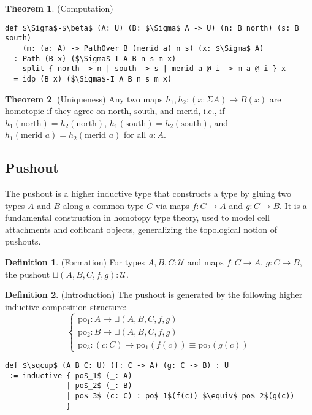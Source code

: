 \documentclass{article}
\theoremstyle{definition}
\newtheorem{theorem}{Theorem}
\newtheorem{definition}{Definition}
\begin{document}
\begin{theorem} (Computation)
\begin{lstlisting}[mathescape=true]
def $\Sigma$-$\beta$ (A: U) (B: $\Sigma$ A -> U) (n: B north) (s: B south)
    (m: (a: A) -> PathOver B (merid a) n s) (x: $\Sigma$ A)
  : Path (B x) ($\Sigma$-I A B n s m x)
    split { north -> n | south -> s | merid a @ i -> m a @ i } x
  = idp (B x) ($\Sigma$-I A B n s m x)
\end{lstlisting}
\end{theorem}

\begin{theorem} (Uniqueness)
Any two maps $h_1, h_2 : (x : \Sigma A) \to B(x)$ are homotopic if they agree
on $\text{north}$, $\text{south}$, and $\text{merid}$, i.e.,
if $h_1(\text{north}) = h_2(\text{north})$, $h_1(\text{south}) = h_2(\text{south})$,
and $h_1(\text{merid } a) = h_2(\text{merid } a)$ for all $a : A$.
\end{theorem}

\subsection{Pushout}
The pushout is a higher inductive type that constructs a type by
gluing two types $A$ and $B$ along a common type $C$ via maps $f : C \to A$
and $g : C \to B$. It is a fundamental construction in homotopy type theory,
used to model cell attachments and cofibrant objects, generalizing the
topological notion of pushouts.

\begin{definition} (Formation)
For types $A, B, C : \mathcal{U}$ and maps $f : C \to A$, $g : C \to B$,
the pushout $\sqcup(A,B,C,f,g) : \mathcal{U}$.
\end{definition}

\begin{definition} (Introduction)
The pushout is generated by the following higher inductive composition structure:
\[
\begin{cases}
\text{po$_1$} : A \to \sqcup(A,B,C,f,g) \\
\text{po$_2$} : B \to \sqcup(A,B,C,f,g) \\
\text{po$_3$} : (c : C) \to \text{po$_1$}(f(c)) \equiv \text{po$_2$}(g(c))
\end{cases}
\]
\begin{lstlisting}[mathescape=true]
def $\sqcup$ (A B C: U) (f: C -> A) (g: C -> B) : U
 := inductive { po$_1$ (_: A)
              | po$_2$ (_: B)
              | po$_3$ (c: C) : po$_1$(f(c)) $\equiv$ po$_2$(g(c))
              }
\end{lstlisting}
\end{definition}
\end{document}
